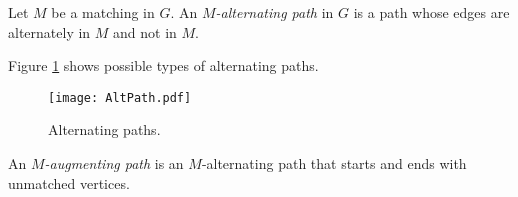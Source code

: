 \begin{page}
\setcounter{section}{4}
\setcounter{subsection}{2}
\setcounter{dfn}{3}
\label{portion:328}

\begin{dfn}
Let $M$ be a matching in $G$.
An \emph{$M$-alternating path} in $G$ is a path whose edges are alternately in $M$ and not in $M$.
\end{dfn}

\end{page}

\begin{page}
\setcounter{section}{4}
\setcounter{subsection}{2}
\setcounter{dfn}{3}
\label{portion:329}


Figure \ref{fig:AltPath} shows possible types of alternating paths.

\begin{figure}[ht]
\begin{center}
\texttt{[image: AltPath.pdf]}
\end{center}
\caption{Alternating paths.}
\label{fig:AltPath}
\end{figure}


\end{page}

\begin{page}
\setcounter{section}{4}
\setcounter{subsection}{2}
\setcounter{dfn}{4}
\label{portion:331}

\begin{dfn}
An \emph{$M$-augmenting path} is an $M$-alternating path that starts and ends with unmatched vertices.
\end{dfn}

\end{page}

